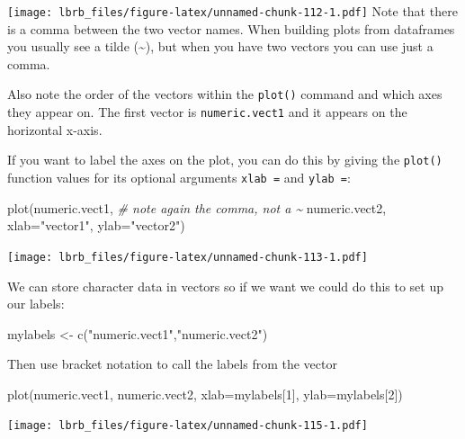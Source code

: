 \documentclass[
]{book}
\newenvironment{Shaded}{\begin{snugshade}}{\end{snugshade}}
\newcommand{\AttributeTok}[1]{\textcolor[rgb]{0.77,0.63,0.00}{#1}}
\newcommand{\CommentTok}[1]{\textcolor[rgb]{0.56,0.35,0.01}{\textit{#1}}}
\newcommand{\DecValTok}[1]{\textcolor[rgb]{0.00,0.00,0.81}{#1}}
\newcommand{\FunctionTok}[1]{\textcolor[rgb]{0.00,0.00,0.00}{#1}}
\newcommand{\NormalTok}[1]{#1}
\newcommand{\OtherTok}[1]{\textcolor[rgb]{0.56,0.35,0.01}{#1}}
\newcommand{\StringTok}[1]{\textcolor[rgb]{0.31,0.60,0.02}{#1}}
\begin{document}
\texttt{[image: lbrb\_files/figure-latex/unnamed-chunk-112-1.pdf]}
Note that there is a comma between the two vector names. When building plots from dataframes you usually see a tilde (\textasciitilde), but when you have two vectors you can use just a comma.

Also note the order of the vectors within the \texttt{plot()} command and which axes they appear on. The first vector is \texttt{numeric.vect1} and it appears on the horizontal x-axis.

If you want to label the axes on the plot, you can do this by giving the \texttt{plot()} function values for its optional arguments \texttt{xlab\ =} and \texttt{ylab\ =}:

\begin{Shaded}
\begin{Highlighting}[]
\FunctionTok{plot}\NormalTok{(numeric.vect1,   }\CommentTok{\# note again the comma, not a \textasciitilde{}}
\NormalTok{     numeric.vect2, }
     \AttributeTok{xlab=}\StringTok{"vector1"}\NormalTok{, }
     \AttributeTok{ylab=}\StringTok{"vector2"}\NormalTok{)}
\end{Highlighting}
\end{Shaded}

\texttt{[image: lbrb\_files/figure-latex/unnamed-chunk-113-1.pdf]}

We can store character data in vectors so if we want we could do this to set up our labels:

\begin{Shaded}
\begin{Highlighting}[]
\NormalTok{mylabels }\OtherTok{\textless{}{-}}  \FunctionTok{c}\NormalTok{(}\StringTok{"numeric.vect1"}\NormalTok{,}\StringTok{"numeric.vect2"}\NormalTok{)}
\end{Highlighting}
\end{Shaded}

Then use bracket notation to call the labels from the vector

\begin{Shaded}
\begin{Highlighting}[]
\FunctionTok{plot}\NormalTok{(numeric.vect1, }
\NormalTok{     numeric.vect2, }
     \AttributeTok{xlab=}\NormalTok{mylabels[}\DecValTok{1}\NormalTok{],}
     \AttributeTok{ylab=}\NormalTok{mylabels[}\DecValTok{2}\NormalTok{])}
\end{Highlighting}
\end{Shaded}

\texttt{[image: lbrb\_files/figure-latex/unnamed-chunk-115-1.pdf]}
\end{document}
